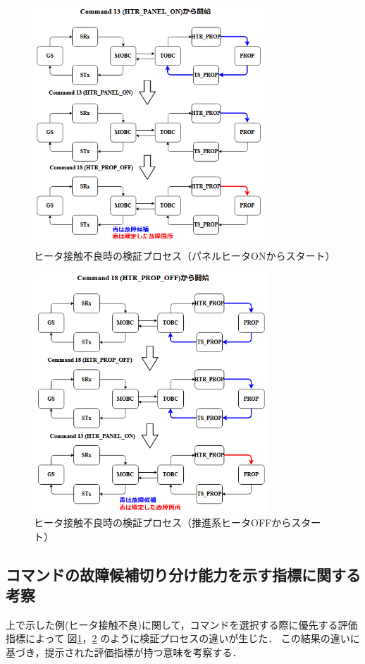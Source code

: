 \documentclass[11pt]{jsreport}
\begin{document}
\begin{figure}[H]
   \centering
      \includegraphics[height=9.0cm]{figure/COM_13process_HTR_PROP_fault.png}
      \caption{ヒータ接触不良時の検証プロセス（パネルヒータONからスタート）}
      \label{fig:COM_13process_HTR_fault}
\end{figure}
\begin{figure}[H]
   \centering
   \includegraphics[height=9.0cm]{figure/COM_18process_HTR_PROP_fault.png}
   \caption{ヒータ接触不良時の検証プロセス（推進系ヒータOFFからスタート）}
   \label{fig:COM_18process_HTR_fault}
\end{figure}

\subsection{コマンドの故障候補切り分け能力を示す指標に関する考察}
上で示した例(ヒータ接触不良)に関して，コマンドを選択する際に優先する評価指標によって
図\ref{fig:COM_13process_HTR_fault}，\ref{fig:COM_18process_HTR_fault}
のように検証プロセスの違いが生じた．
この結果の違いに基づき，提示された評価指標が持つ意味を考察する．
\end{document}
